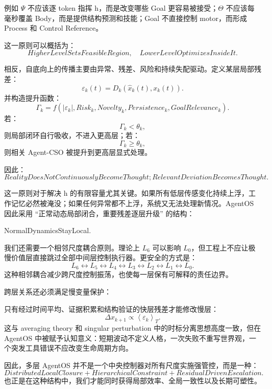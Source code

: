 例如 $\Psi$ 不应该逐 token 指挥 h，而是改变哪些 Goal 更容易被接受；$\Theta$ 不应该每毫秒覆盖 Body，而是提供结构预测和技能；Goal 不直接控制 motor，而形成 Process 和 Control Reference。

这一原则可以概括为：
\[
\boxed{
HigherLevelSetsFeasibleRegion,
\quad
LowerLevelOptimizesInsideIt.
}
\]

相反，自底向上的传播主要由异常、残差、风险和持续失配驱动。定义某层局部残差：
\[
\varepsilon_k(t)
=
D_k
\left(
\hat{x}_k(t),
x_k(t)
\right).
\]
并构造提升函数：
\[
\Gamma_k
=
f
\left(
|\varepsilon_k|,
Risk_k,
Novelty_k,
Persistence_k,
GoalRelevance_k
\right).
\]
若：
\[
\Gamma_k<\theta_k,
\]
则局部闭环自行吸收，不进入更高层；若：
\[
\Gamma_k\geq\theta_k,
\]
则相关 Agent-CSO 被提升到更高层显式处理。

因此：
\[
\boxed{
RealityDoesNotContinuouslyBecomeThought;
RelevantDeviationBecomesThought.
}
\]

这一原则对于解决 h 的有限容量尤其关键。如果所有低层传感变化持续上浮，工作记忆必然被淹没；如果任何异常都不上浮，系统又无法处理新情况。AgentOS 因此采用 ``正常动态局部闭合，重要残差逐层升级'' 的结构：
\begin{statementbox}
NormalDynamicsStayLocal.
\end{statementbox}

我们还需要一个相邻尺度耦合原则。理论上 $L_6$ 可以影响 $L_0$，但工程上不应让极慢价值层直接跳过全部中间层控制执行器。更安全的方式是：
\[
L_6
\leftrightarrow
L_5
\leftrightarrow
L_4
\leftrightarrow
L_3
\leftrightarrow
L_2
\leftrightarrow
L_1
\leftrightarrow
L_0.
\]
这种相邻耦合减少跨尺度控制振荡，也使每一层保有可解释的责任边界。

跨层关系还必须满足慢变量保护：
\begin{statementbox}
\centering
{}
\end{statementbox}
只有经过时间平均、证据积累和结构验证的快层残差才能修改慢层：
\[
\Delta x_{k+1}
\propto
\left\langle
\varepsilon_k
\right\rangle_T.
\]
这与 averaging theory 和 singular perturbation 中的时标分离思想高度一致，但在 AgentOS 中被赋予认知意义：短期波动不定义人格，一次失败不重写世界观，一个突发工具错误不应改变生命周期方向。

因此，多层 AgentOS 并不是一个中央控制器对所有尺度实施强管控，而是一种：
\[
\boxed{
DistributedLocalClosure
+
HierarchicalConstraint
+
ResidualDrivenEscalation.
}
\]
也正是在这种结构中，我们才能同时获得局部效率、全局一致性以及长期可塑性。

